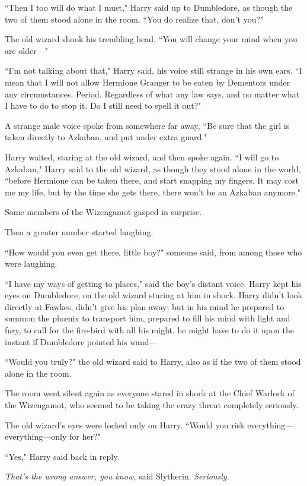 ``Then I too will do what I must," Harry said up to Dumbledore, as though the two of them stood alone in the room. ``You do realize that, don't you?"

The old wizard shook his trembling head. ``You will change your mind when you are older—"

``I'm not talking about that," Harry said, his voice still strange in his own ears. ``I mean that I will not allow Hermione Granger to be eaten by Dementors under any circumstances. Period. Regardless of what any law says, and no matter what I have to do to stop it. Do I still need to spell it out?"

A strange male voice spoke from somewhere far away, ``Be sure that the girl is taken directly to Azkaban, and put under extra guard."

Harry waited, staring at the old wizard, and then spoke again. ``I will go to Azkaban," Harry said to the old wizard, as though they stood alone in the world, ``before Hermione can be taken there, and start snapping my fingers. It may cost me my life, but by the time she gets there, there won't be an Azkaban anymore."

Some members of the Wizengamot gasped in surprise.

Then a greater number started laughing.

``How would you even get there, little boy?" someone said, from among those who were laughing.

``I have my ways of getting to places," said the boy's distant voice. Harry kept his eyes on Dumbledore, on the old wizard staring at him in shock. Harry didn't look directly at Fawkes, didn't give his plan away; but in his mind he prepared to summon the phœnix to transport him, prepared to fill his mind with light and fury, to call for the fire-bird with all his might, he might have to do it upon the instant if Dumbledore pointed his wand—

``Would you truly?" the old wizard said to Harry, also as if the two of them stood alone in the room.

The room went silent again as everyone stared in shock at the Chief Warlock of the Wizengamot, who seemed to be taking the crazy threat completely seriously.

The old wizard's eyes were locked only on Harry. ``Would you risk everything—everything—only for her?"

``Yes," Harry said back in reply.

\emph{That's the wrong answer, you know,} said Slytherin. \emph{Seriously.}

